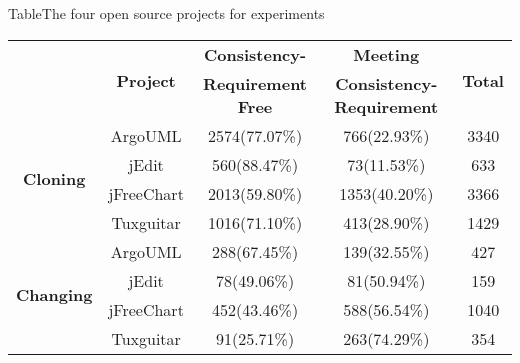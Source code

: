 \begin{table*}[ht]
{Table$\!$}{The four open source projects for experiments}
\vspace{0.5em}
\centering
\wuhao
\begin{tabular}{ccccc}
\toprule[1.5pt]
~\multirow{2}{*}{\textbf{Instances}}&\multirow{2}{*}{\textbf{Project}}&\textbf{Consistency-} &\textbf{Meeting} &\multirow{2}{*}{\textbf{Total}}\\
~&~&\textbf{Requirement Free}&\textbf{Consistency-Requirement}&~\\
\midrule[1pt]
\multirow{4}{*}{\textbf{Cloning}}
&ArgoUML&	2574(77.07\%)&	766(22.93\%)&	3340\\
&jEdit&560(88.47\%)&	73(11.53\%)&	633\\
&jFreeChart&	2013(59.80\%)&	1353(40.20\%)&	3366\\
&Tuxguitar&	1016(71.10\%)&	413(28.90\%)&	1429\\
\hline
\multirow{4}{*}{\textbf{Changing}}
&ArgoUML&288(67.45\%)&139(32.55\%)&427\\
&jEdit&78(49.06\%)&81(50.94\%)&159\\
&jFreeChart&452(43.46\%)&588(56.54\%)&1040\\
&Tuxguitar&91(25.71\%)&263(74.29\%)&354\\
\bottomrule[1.5pt]
\end{tabular}
\end{table*}


